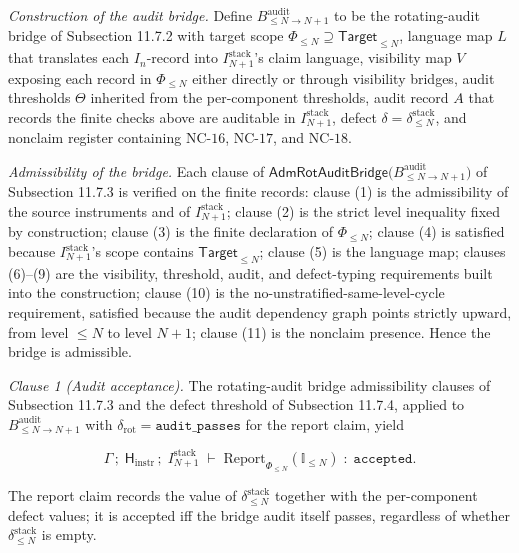 \documentclass[11pt]{article}
\theoremstyle{definition}
\begin{document}
\emph{Construction of the audit bridge.} Define \(B^{\mathrm{audit}}_{\le N\to N+1}\) to be the rotating-audit bridge of Subsection 11.7.2 with target scope \(\Phi_{\le N}\supseteq\mathsf{Target}_{\le N}\), language map \(L\) that translates each \(I_n\)-record into \(I_{N+1}^{\mathrm{stack}}\)'s claim language, visibility map \(V\) exposing each record in \(\Phi_{\le N}\) either directly or through visibility bridges, audit thresholds \(\Theta\) inherited from the per-component thresholds, audit record \(A\) that records the finite checks above are auditable in \(I_{N+1}^{\mathrm{stack}}\), defect \(\delta=\delta_{\le N}^{\mathrm{stack}}\), and nonclaim register containing \(\mathrm{NC}\text{-}16\), \(\mathrm{NC}\text{-}17\), and \(\mathrm{NC}\text{-}18\).

\emph{Admissibility of the bridge.} Each clause of \(\mathsf{AdmRotAuditBridge}\bigl(B^{\mathrm{audit}}_{\le N\to N+1}\bigr)\) of Subsection 11.7.3 is verified on the finite records: clause (1) is the admissibility of the source instruments and of \(I_{N+1}^{\mathrm{stack}}\); clause (2) is the strict level inequality fixed by construction; clause (3) is the finite declaration of \(\Phi_{\le N}\); clause (4) is satisfied because \(I_{N+1}^{\mathrm{stack}}\)'s scope contains \(\mathsf{Target}_{\le N}\); clause (5) is the language map; clauses (6)--(9) are the visibility, threshold, audit, and defect-typing requirements built into the construction; clause (10) is the no-unstratified-same-level-cycle requirement, satisfied because the audit dependency graph points strictly upward, from level \(\le N\) to level \(N+1\); clause (11) is the nonclaim presence. Hence the bridge is admissible.

\emph{Clause 1 (Audit acceptance).} The rotating-audit bridge admissibility clauses of Subsection 11.7.3 and the defect threshold of Subsection 11.7.4, applied to \(B^{\mathrm{audit}}_{\le N\to N+1}\) with \(\delta_{\mathrm{rot}}=\texttt{audit\_passes}\) for the report claim, yield

\[
\Gamma\,;\;\mathsf H_{\mathrm{instr}}\,;\;I_{N+1}^{\mathrm{stack}}\;\vdash\;\mathrm{Report}_{\Phi_{\le N}}(\mathbb I_{\le N})\;:\;\texttt{accepted}.
\]

The report claim records the value of \(\delta_{\le N}^{\mathrm{stack}}\) together with the per-component defect values; it is accepted iff the bridge audit itself passes, regardless of whether \(\delta_{\le N}^{\mathrm{stack}}\) is empty.
\end{document}
